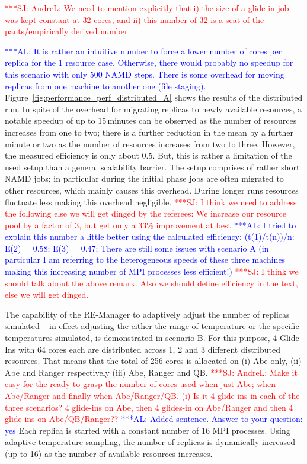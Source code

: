 \documentclass{rspublic}
\newcommand{\alnote}[1]{ {\textcolor{blue} { ***AL: #1 }}}
\newcommand{\jhanote}[1]{ {\textcolor{red} { ***SJ: #1 }}}
\newcommand{\alnote}[1]{}
\newcommand{\jhanote}[1]{}
\begin{document}
\jhanote{AndreL: We need to mention explicitly that i) the size of a
  glide-in job was kept constant at 32 cores, and ii) this number of 32
  is a seat-of-the-pants/empirically derived number.}

\alnote{It is rather an intuitive number to force a lower number of
  cores per replica for the 1 resource case. Otherwise, there would
  probably no speedup for this scenario with only 500 NAMD
  steps. There is some overhead for moving replicas from one machine
  to another one (file staging).}
Figure~\ref{fig:performance_perf_distributed_A} shows the results of
the distributed run. In spite of the overhead for migrating replicas
to newly available resources, a notable speedup of up to 15\,minutes
can be observed as the number of resources increases from one to two;
there is a further reduction in the mean by a further minute or two as
the number of resources increases from two to three.  However, the
measured efficiency is only about 0.5. But, this is rather a
limitation of the used setup than a general scalability barrier.  The
setup comprises of rather short NAMD jobs; in particular during the
initial phase jobs are often migrated to other resources, which mainly
causes this overhead. During longer runs resources fluctuate less
making this overhead negligible.  \jhanote{I think we need to address
  the following else we will get dinged by the referees: We increase
  our resource pool by a factor of 3, but get only a 33\% improvement
  at best} \alnote{I tried to explain this number a little better
  using the calculated efficiency: (t(1)/t(n))/n: E(2) = 0.58; E(3) =
  0.47; There are still some issues with scenario A (in particular I
  am referring to the heterogeneous speeds of these three machines
  making this increasing number of MPI processes less efficient!)}
\jhanote{I think we should talk about the above remark. Also we should
  define efficiency in the text, else we will get dinged.}  

The capability of the RE-Manager to adaptively adjust the number of
replicas simulated -- in effect adjusting the either the range of
temperature or the specific temperatures simulated, is demonstrated in
scenario B. For this purpose, 4 Glide-Ins with 64 cores each are
distributed across 1, 2 and 3 different distributed resources. That
means that the total of 256 cores is allocated on (i) Abe only, (ii)
Abe and Ranger respectively (iii) Abe, Ranger and QB.
\jhanote{AndreL: Make it easy for the ready to grasp the number of
  cores used when just Abe; when Abe/Ranger and finally when
  Abe/Ranger/QB. (i) Is it 4 glide-ins in each of the three scenarios?
  4 glide-ins on Abe, then 4 glides-in on Abe/Ranger and then 4
  glide-ins on Abe/QB/Ranger??}  \alnote{Added sentence. Answer to
  your question: yes} Each replica is started with a constant number
of 16 MPI processes.  Using adaptive temperature sampling, the number
of replicas is dynamically increased (up to 16) as the number of
available resources increases. 
\end{document}
